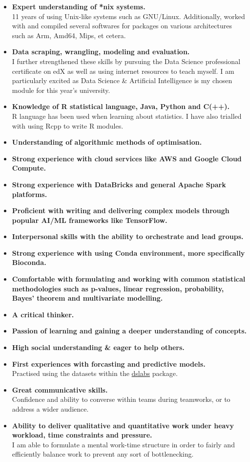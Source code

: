 \documentclass[a4paper,10pt]{article} %
\begin{document}
\begin{itemize}
\item{\textbf{Expert understanding of *nix systems.}} \\
11 years of using Unix-like systems such as GNU/Linux. Additionally, worked with and compiled several softwares for packages on various architectures such as Arm, Amd64, Mips, et cetera.
\item{\textbf{Data scraping, wrangling, modeling and evaluation.}} \\
I further strengthened these skills by pursuing the Data Science professional certificate on edX as well as using internet resources to teach myself. I am particularly excited as Data Science \& Artificial Intelligence is my chosen module for this year's university.
\item{\textbf{Knowledge of R statistical language, Java, Python and C(++).}} \\
R language has been used when learning about statistics. I have also trialled with using Rcpp to write R modules.
\item{\textbf{Understanding of algorithmic methods of optimisation.}}
\item{\textbf{Strong experience with cloud services like AWS and Google Cloud Compute.}}
\item{\textbf{Strong experience with DataBricks and general Apache Spark platforms.}}
\item{\textbf{Proficient with writing and delivering complex models through popular AI/ML frameworks like TensorFlow.}}
\item{\textbf{Interpersonal skills with the ability to orchestrate and lead groups.}}
\item{\textbf{Strong experience with using Conda environment, more specifically Bioconda.}}
\item{\textbf{Comfortable with formulating and working with common statistical \\ methodologies such as p-values, linear regression, probability, Bayes' theorem and multivariate modelling.}}
\item{\textbf{A critical thinker.}}
\item{\textbf{Passion of learning and gaining a deeper understanding of concepts.}}
\item{\textbf{High social understanding \& eager to help others.}}
\item{\textbf{First experiences with forcasting and predictive models.}} \\
Practised using the datasets within the \href{https://cran.r-project.org/web/packages/dslabs/index.html}{dslabs} package.
\item{\textbf{Great communicative skills.}} \\
Confidence and ability to converse within teams during teamworks, or to address a wider audience.
\item{\textbf{Ability to deliver qualitative and quantitative work under heavy workload, time constraints and pressure.}} \\
I am able to formulate a mental work-time structure in order to fairly and efficiently balance work to prevent any sort of bottlenecking.
\end{itemize}
\end{document}
